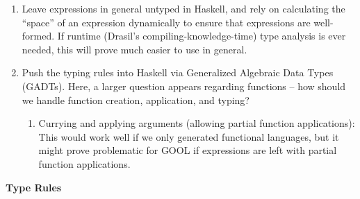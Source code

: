 \begin{enumerate}

    \item Leave expressions in general untyped in Haskell, and rely on calculating
          the ``space'' of an expression dynamically to ensure that expressions are
          well-formed. If runtime (Drasil's compiling-knowledge-time) type analysis
          is ever needed, this will prove much easier to use in general.
    
    \item Push the typing rules into Haskell via Generalized Algebraic Data Types (GADTs).
          Here, a larger question appears regarding functions -- how should we handle
          function creation, application, and typing?
          
          \begin{enumerate}

              \item Currying and applying arguments (allowing partial function applications):
                    This would work well if we only generated functional languages, but it might
                    prove problematic for GOOL if expressions are left with partial function
                    applications.

          \end{enumerate}
          
\end{enumerate}

\textbf{Type Rules}

